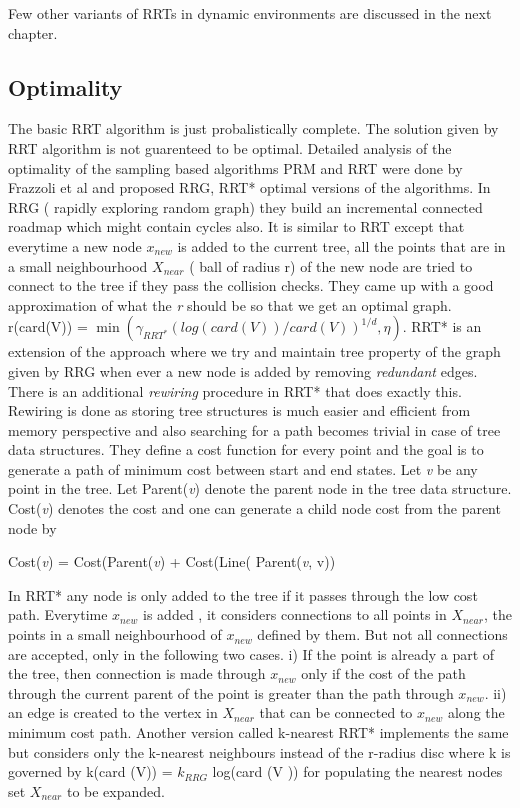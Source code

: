 \documentclass[MTech]{iitmdiss}
\begin{document}
Few other variants of RRTs in dynamic environments are discussed in the next chapter.

 \subsection{Optimality}
 The basic RRT algorithm is just probalistically complete. The solution given by RRT algorithm is not guarenteed to be optimal. Detailed analysis of the optimality of the sampling based algorithms PRM and RRT were done by Frazzoli  et al 
\cite{karaman11}
 and proposed  RRG, RRT* optimal versions of the algorithms.
  In RRG ( rapidly exploring random graph) they build an incremental connected roadmap which might contain cycles also. It is similar to RRT except that everytime a new node $x_{new}$ is added to the current tree, all the points that are in a small neighbourhood $X_{near}$ ( ball of radius r) of the new node are tried to connect to the tree if they pass the collision checks. 
 They came up with a good approximation of what the \emph{r} should be so that we get an optimal graph. r(card(V)) = $\min(\gamma_{RRT^*} (log(card(V))/card(V))^{1/d}  , \eta   )$.   RRT* is an extension of the approach where we try and maintain tree property of the graph given by RRG when ever a new node is added by removing \emph{redundant} edges. There is an additional \emph{rewiring} procedure in RRT*  that does exactly this. Rewiring is done as storing tree structures is much easier and efficient from memory perspective and also searching for a path becomes trivial in case of tree data structures. They define a cost function for every point and the goal is to generate a path of minimum cost between start and end states. Let \textit{v} be any point in the tree. Let Parent(\textit{v}) denote the parent node in the tree data structure.  Cost(\textit{v}) denotes the cost and one can generate a child node cost from the parent node by 

Cost(\textit{v}) = Cost(Parent(\textit{v}) +  Cost(Line( Parent(\textit{v}, v)) 

In RRT* any node is only added to the tree if it passes through the low cost path. Everytime $x_{new}$ is added , it considers connections to all points in $X_{near}$, the points in a small neighbourhood of $x_{new}$ defined by them. But not all connections are accepted, only in the following two cases. i) If the point is already a part of the tree, then connection is made through $x_{new}$ only if the cost of the path through the current parent of the point is greater than the path through $x_{new}$.  ii) an edge is created to the vertex in $X_{near}$ that can be connected to $x_{new }$ along the minimum cost path. Another version called k-nearest RRT* implements the same but considers only the k-nearest neighbours instead of the r-radius disc where k is governed by k(card (V)) = $k_{RRG}$ log(card (V )) for populating the nearest nodes set $X_{near}$ to be expanded.
 
\end{document}

